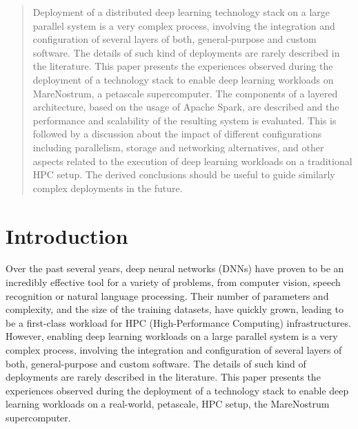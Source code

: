 \documentclass[journal]{IEEEtran}
\begin{document}
\begin{abstract}
Deployment of a distributed deep learning technology stack on a large parallel system is a very complex process, involving the integration and configuration of several layers of both, general-purpose and custom software. The details of such kind of deployments are rarely described in the literature. This paper presents the experiences observed during the deployment of a technology stack to enable deep learning workloads on MareNostrum, a petascale supercomputer. The components of a layered architecture, based on the usage of Apache Spark, are described and the performance and scalability of the resulting system is evaluated. This is followed by a discussion about the impact of different configurations including parallelism, storage and networking alternatives, and other aspects related to the execution of deep learning workloads on a traditional HPC setup. The derived conclusions should be useful to guide similarly complex deployments in the future.

\end{abstract}



\section{Introduction}

Over the past several years, deep neural networks (DNNs) have proven to be an incredibly effective tool for a variety of problems, from computer vision, speech recognition or natural language processing. Their number of parameters and complexity, and the size of the training datasets, have quickly grown, leading to be a first-class workload for HPC (High-Performance Computing) infrastructures. However, enabling deep learning workloads on a large parallel system is a very complex process, involving the integration and configuration of several layers of both, general-purpose and custom software. The details of such kind of deployments are rarely described in the literature. This paper presents the experiences observed during the deployment of a technology stack to enable deep learning workloads on a real-world, petascale, HPC setup, the MareNostrum supercomputer. 
\end{document}
